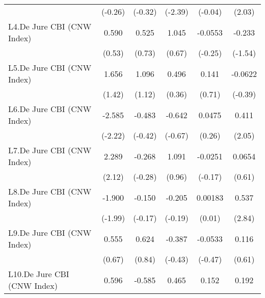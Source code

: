 {\begin{tabular}{l*{5}{c}}
                                        &   (-0.26)         &   (-0.32)         &   (-2.39)         &   (-0.04)         &    (2.03)         \\
\addlinespace
L4.De Jure CBI (CNW Index)              &     0.590         &     0.525         &     1.045         &   -0.0553         &    -0.233         \\
                                        &    (0.53)         &    (0.73)         &    (0.67)         &   (-0.25)         &   (-1.54)         \\
\addlinespace
L5.De Jure CBI (CNW Index)              &     1.656         &     1.096         &     0.496         &     0.141         &   -0.0622         \\
                                        &    (1.42)         &    (1.12)         &    (0.36)         &    (0.71)         &   (-0.39)         \\
\addlinespace
L6.De Jure CBI (CNW Index)              &    -2.585\sym{*}  &    -0.483         &    -0.642         &    0.0475         &     0.411\sym{*}  \\
                                        &   (-2.22)         &   (-0.42)         &   (-0.67)         &    (0.26)         &    (2.05)         \\
\addlinespace
L7.De Jure CBI (CNW Index)              &     2.289\sym{*}  &    -0.268         &     1.091         &   -0.0251         &    0.0654         \\
                                        &    (2.12)         &   (-0.28)         &    (0.96)         &   (-0.17)         &    (0.61)         \\
\addlinespace
L8.De Jure CBI (CNW Index)              &    -1.900\sym{*}  &    -0.150         &    -0.205         &   0.00183         &     0.537\sym{**} \\
                                        &   (-1.99)         &   (-0.17)         &   (-0.19)         &    (0.01)         &    (2.84)         \\
\addlinespace
L9.De Jure CBI (CNW Index)              &     0.555         &     0.624         &    -0.387         &   -0.0533         &     0.116         \\
                                        &    (0.67)         &    (0.84)         &   (-0.43)         &   (-0.47)         &    (0.61)         \\
\addlinespace
L10.De Jure CBI (CNW Index)             &     0.596         &    -0.585         &     0.465         &     0.152         &     0.192         \\

\end{tabular}}
